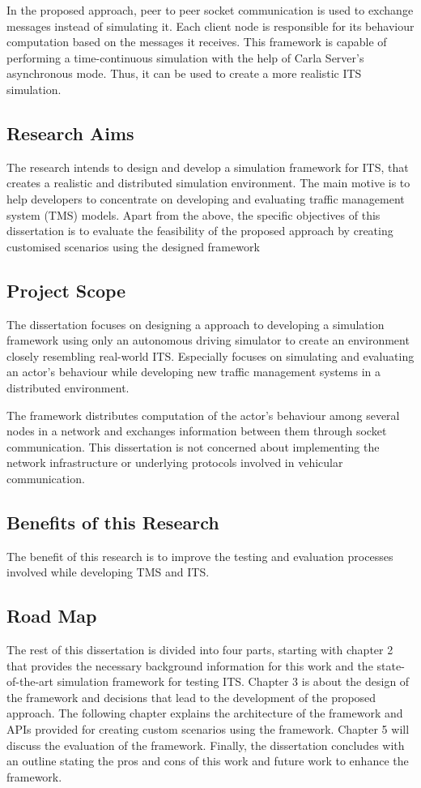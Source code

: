 In the proposed approach, peer to peer socket communication is used to exchange messages instead of simulating it. Each client node is responsible for its behaviour computation based on the messages it receives. This framework is capable of performing a time-continuous simulation with the help of Carla Server's asynchronous mode. Thus, it can be used to create a more realistic ITS simulation.


\subsection{Research Aims}
The research intends to design and develop a simulation framework for ITS, that creates a realistic and distributed simulation environment. The main motive is to help developers to concentrate on developing and evaluating traffic management system (TMS) models. Apart from the above, the specific objectives of this dissertation is to evaluate the feasibility of the proposed approach by creating customised scenarios using the designed framework

\subsection{Project Scope}
The dissertation focuses on designing a approach to developing a simulation framework using only an autonomous driving simulator
to create an environment closely resembling real-world ITS. Especially focuses on simulating and evaluating an actor's behaviour while developing new traffic management systems in a distributed environment. 

The framework distributes computation of the actor's behaviour among several nodes in a network and exchanges information between them through socket communication. This dissertation is not concerned about implementing the network infrastructure or underlying protocols involved in vehicular communication. 
\subsection{Benefits of this Research}
The benefit of this research is to improve the testing and evaluation processes involved while developing TMS and ITS. 
\subsection{Road Map}
The rest of this dissertation is divided into four parts, starting with chapter 2 that provides the necessary background information for this work and the state-of-the-art simulation framework for testing ITS. Chapter 3 is about the design of the framework and decisions that lead to the development of the proposed approach. The following chapter explains the architecture of the framework and APIs provided for creating custom scenarios using the framework. Chapter 5 will discuss the evaluation of the framework. Finally, the dissertation concludes with an outline stating the pros and cons of this work and future work to enhance the framework.
